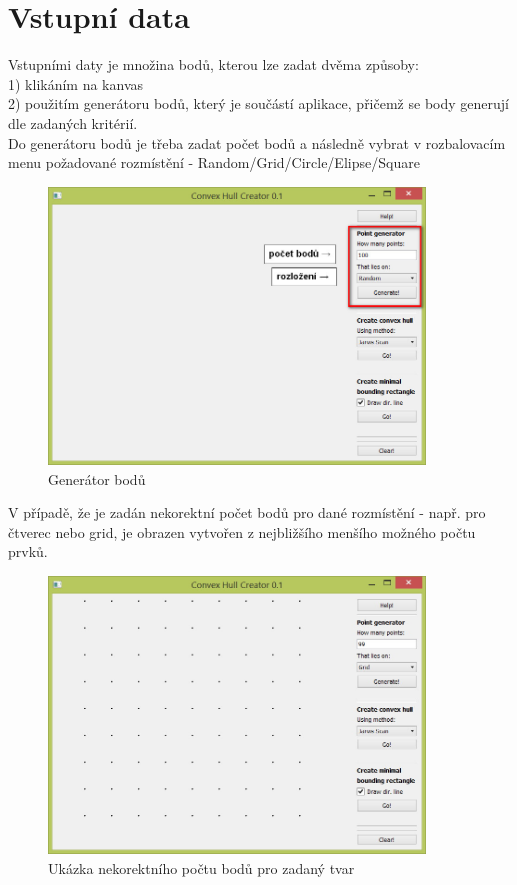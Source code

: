 \documentclass[a4paper, 12pt]{article}
\begin{document}
\clearpage

\section{Vstupní data}

Vstupními daty je množina bodů, kterou lze zadat dvěma způsoby:\\
1) klikáním na kanvas\\
2) použitím generátoru bodů, který je součástí aplikace, přičemž se body generují dle zadaných kritérií.\\


 Do generátoru bodů je třeba zadat počet bodů a následně vybrat v rozbalovacím menu 
 požadované rozmístění - Random/Grid/Circle/Elipse/Square 

\begin{figure}[h]
	\centering
	\includegraphics[width=10cm]{vstup_nastaveni.jpg}
	\caption{Generátor bodů}
\end{figure}
 
V případě, že je zadán nekorektní počet bodů pro dané rozmístění - např. pro čtverec nebo grid, je obrazen vytvořen z nejbližšího menšího možného počtu prvků.

\begin{figure}[h]
	\centering
	\includegraphics[width=10cm]{vstup.jpg}
	\caption{Ukázka nekorektního počtu bodů pro zadaný tvar}
\end{figure}
 
\end{document}
